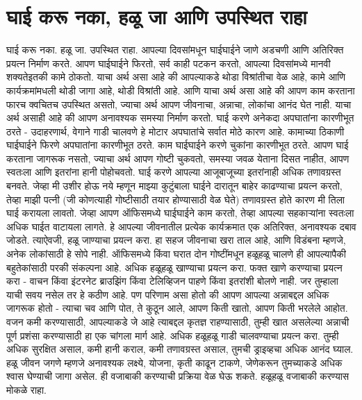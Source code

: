 \chapter{घाई करू नका, हळू जा आणि उपस्थित राहा}
घाई करू नका. हळू जा. उपस्थित राहा. आपल्या दिवसांमधून घाईघाईने जाणे अडचणी आणि अतिरिक्त प्रयत्न निर्माण करते.
आपण घाईघाईने फिरतो, सर्व काही पटकन करतो, आपल्या दिवसांमध्ये मानवी शक्यतेइतकी कामे ठोकतो. याचा अर्थ असा आहे की आपल्याकडे थोडा विश्रांतीचा वेळ आहे, कामे आणि कार्यक्रमांमधली थोडी जागा आहे, थोडी विश्रांती आहे. आणि याचा अर्थ असा आहे की आपण काम करताना फारच क्वचितच उपस्थित असतो, ज्याचा अर्थ आपण जीवनाचा, अन्नाचा, लोकांचा आनंद घेत नाही.
याचा अर्थ असाही आहे की आपण अनावश्यक समस्या निर्माण करतो. घाई करणे अनेकदा अपघातांना कारणीभूत ठरते - उदाहरणार्थ, वेगाने गाडी चालवणे हे मोटार अपघातांचे सर्वात मोठे कारण आहे. कामाच्या ठिकाणी घाईघाईने फिरणे अपघातांना कारणीभूत ठरते. काम घाईघाईने करणे चुकांना कारणीभूत ठरते. आपण घाई करताना जागरूक नसतो, ज्याचा अर्थ आपण गोष्टी चुकवतो, समस्या जवळ येताना दिसत नाहीत, आपण स्वतःला आणि इतरांना हानी पोहोचवतो.
घाई करणे आपल्या आजूबाजूच्या इतरांनाही अधिक तणावग्रस्त बनवते. जेव्हा मी उशीर होऊ नये म्हणून माझ्या कुटुंबाला घाईने दारातून बाहेर काढण्याचा प्रयत्न करतो, तेव्हा माझी पत्नी (जी कोणत्याही गोष्टीसाठी तयार होण्यासाठी वेळ घेते) तणावग्रस्त होते कारण मी तिला घाई करायला लावतो. जेव्हा आपण ऑफिसमध्ये घाईघाईने काम करतो, तेव्हा आपल्या सहकाऱ्यांना स्वतःला अधिक घाईत वाटायला लागते. हे आपल्या जीवनातील प्रत्येक कार्यक्रमात एक अतिरिक्त, अनावश्यक दबाव जोडते.
त्याऐवजी, हळू जाण्याचा प्रयत्न करा. हा सहज जीवनाचा खरा ताल आहे, आणि विडंबना म्हणजे, अनेक लोकांसाठी हे सोपे नाही. ऑफिसमध्ये किंवा घरात दोन गोष्टींमधून हळूहळू चालणे ही आपल्यापैकी बहुतेकांसाठी परकी संकल्पना आहे.
अधिक हळूहळू खाण्याचा प्रयत्न करा. फक्त खाणे करण्याचा प्रयत्न करा - वाचन किंवा इंटरनेट ब्राउझिंग किंवा टेलिव्हिजन पाहणे किंवा इतरांशी बोलणे नाही. जर तुम्हाला याची सवय नसेल तर हे कठीण आहे. पण परिणाम असा होतो की आपण आपल्या अन्नाबद्दल अधिक जागरूक होतो - त्याचा चव आणि पोत, ते कुठून आले, आपण किती खातो, आपण किती भरलेले आहोत. वजन कमी करण्यासाठी, आपल्याकडे जे आहे त्याबद्दल कृतज्ञ राहण्यासाठी, तुम्ही खात असलेल्या अन्नाची पूर्ण प्रशंसा करण्यासाठी हा एक चांगला मार्ग आहे.
अधिक हळूहळू गाडी चालवण्याचा प्रयत्न करा. तुम्ही अधिक सुरक्षित असाल, कमी हानी कराल, कमी तणावग्रस्त असाल, तुमची ड्राइव्हचा अधिक आनंद घ्याल.
हळू जीवन जगणे म्हणजे अनावश्यक लक्ष्ये, योजना, कृती काढून टाकणे, जेणेकरून तुमच्याकडे अधिक श्वास घेण्याची जागा असेल. ही वजाबाकी करण्याची प्रक्रिया वेळ घेऊ शकते. हळूहळू वजाबाकी करण्यास मोकळे राहा.


